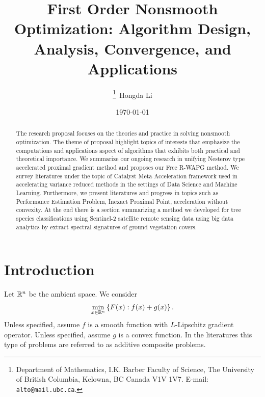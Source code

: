 \documentclass[12pt]{article}
\begin{document}
\title{
    {
        \selectfont 
        First Order Nonsmooth Optimization: 
        Algorithm Design, Analysis, Convergence, and Applications
    }
    }

\author{
    \thanks{Department of Mathematics, I.K. Barber Faculty of Science,
    The University of British Columbia, Kelowna, BC Canada V1V 1V7. 
    E-mail:  \texttt{alto@mail.ubc.ca}.}~Hongda Li
}

\date{\today}

\maketitle


\begin{abstract} 
    \noindent
    The research proposal focuses on the theories and practice in solving nonsmooth optimization. 
    The theme of proposal highlight topics of interests that emphasize the computations and applications aspect of algorithms that exhibits both practical and theoretical importance. 
    We summarize our ongoing research in unifying Nesterov type accelerated proximal gradient method and proposes our Free R-WAPG method. 
    We survey literatures under the topic of Catalyst Meta Acceleration framework used in accelerating variance reduced methods in the settings of Data Science and Machine Learning. 
    Furthermore, we present literatures and progress in topics such as Performance Estimation Problem, Inexact Proximal Point, acceleration without convexity. 
    At the end there is a section summarizing a method we developed for tree species classifications using Sentinel-2 satellite remote sensing data using big data analytics by extract spectral signatures of ground vegetation covers. 


\end{abstract}

\newpage
\tableofcontents

\section{Introduction}
    Let $\mathbb R^n$ be the ambient space. We consider 
    \begin{align}
        \min_{x \in \mathbb R^n} \left\lbrace
            F(x): f(x) + g(x)
        \right\rbrace.
    \end{align}\label{eqn:additive-comp-obj}
    Unless specified, assume $f$ is a smooth function with $L$-Lipschitz gradient operator. 
    Unless specified, assume $g$ is a convex function. 
    In the literatures this type of problems are referred to as additive composite problems. 
\end{document}
